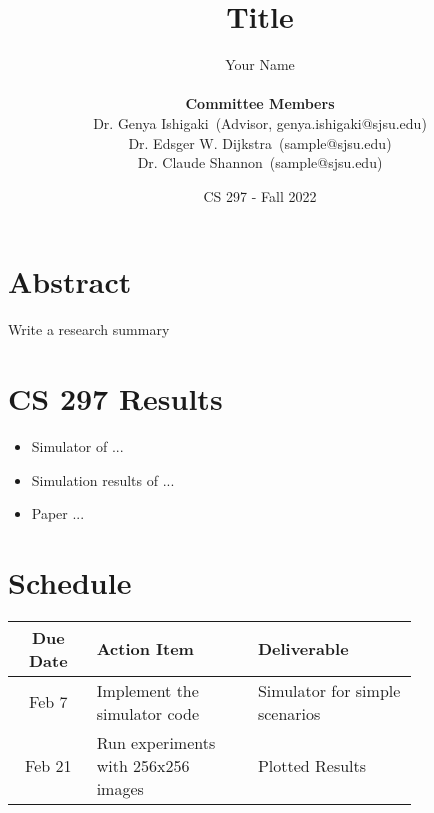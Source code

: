 \documentclass[11pt,onecolumn]{article}
\theoremstyle{definition}
\begin{document}
\title{Title}
\def\myname{Your Name}
\def\adv{Dr. Genya Ishigaki}
\def\advemail{genya.ishigaki@sjsu.edu}
\def\comone{Dr. Edsger W. Dijkstra}
\def\comoneemail{sample@sjsu.edu}
\def\comtwo{Dr. Claude Shannon}
\def\comtwoemail{sample@sjsu.edu}
\date{CS 297 - Fall 2022}


\author{
    \myname\\ 
    \\
    \textbf{Committee Members}\\
    \adv\ (Advisor, \advemail)\\
    \comone\ (\comoneemail)\\
    \comtwo\ (\comtwoemail)
}

\maketitle


\section{Abstract}
Write a research summary


\section{CS 297 Results}
\begin{itemize}
    \item Simulator of ...
    \item Simulation results of ...
    \item Paper ...
\end{itemize}


\section{Schedule}

\begin{table}[h!]
  \begin{center}
    \label{tab:table1}
    \begin{tabular}{c|p{0.4\linewidth}|p{0.4\linewidth}}
      \hline
      \textbf{Due Date} & \textbf{Action Item} & \textbf{Deliverable}\\
      \hline
      Feb 7 & Implement the simulator code & Simulator for simple scenarios\\ 
      Feb 21 & Run experiments with 256x256 images & Plotted Results\\
      \hline
    \end{tabular}
  \end{center}
\end{table}
\end{document}
